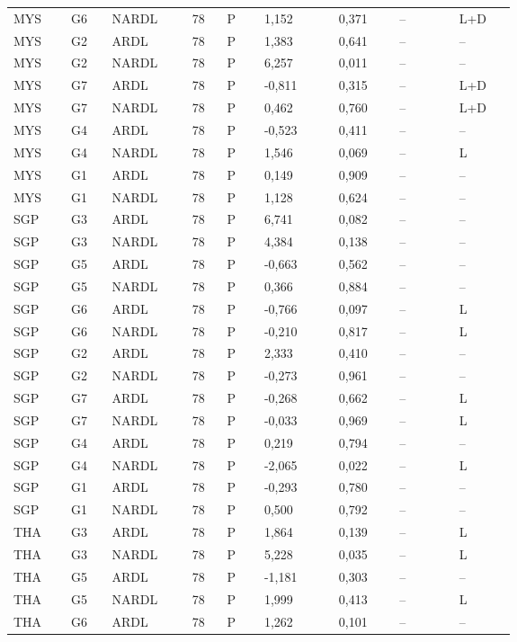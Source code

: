 {\begin{longtable}{p{0.075\linewidth}p{0.05\linewidth}p{0.09\linewidth}p{0.04\linewidth}p{0.05\linewidth}p{0.1\linewidth}p{0.085\linewidth}p{0.085\linewidth}p{0.075\linewidth}}
MYS & G6 & NARDL & 78 & P & 1,152 & 0,371 & -- & L+D\\
MYS & G2 & ARDL & 78 & P & 1,383 & 0,641 & -- & --\\
MYS & G2 & NARDL & 78 & P & 6,257 & 0,011 & -- & --\\
MYS & G7 & ARDL & 78 & P & -0,811 & 0,315 & -- & L+D\\
MYS & G7 & NARDL & 78 & P & 0,462 & 0,760 & -- & L+D\\
MYS & G4 & ARDL & 78 & P & -0,523 & 0,411 & -- & --\\
MYS & G4 & NARDL & 78 & P & 1,546 & 0,069 & -- & L\\
MYS & G1 & ARDL & 78 & P & 0,149 & 0,909 & -- & --\\
MYS & G1 & NARDL & 78 & P & 1,128 & 0,624 & -- & --\\
SGP & G3 & ARDL & 78 & P & 6,741 & 0,082 & -- & --\\
SGP & G3 & NARDL & 78 & P & 4,384 & 0,138 & -- & --\\
SGP & G5 & ARDL & 78 & P & -0,663 & 0,562 & -- & --\\
SGP & G5 & NARDL & 78 & P & 0,366 & 0,884 & -- & --\\
SGP & G6 & ARDL & 78 & P & -0,766 & 0,097 & -- & L\\
SGP & G6 & NARDL & 78 & P & -0,210 & 0,817 & -- & L\\
SGP & G2 & ARDL & 78 & P & 2,333 & 0,410 & -- & --\\
SGP & G2 & NARDL & 78 & P & -0,273 & 0,961 & -- & --\\
SGP & G7 & ARDL & 78 & P & -0,268 & 0,662 & -- & L\\
SGP & G7 & NARDL & 78 & P & -0,033 & 0,969 & -- & L\\
SGP & G4 & ARDL & 78 & P & 0,219 & 0,794 & -- & --\\
SGP & G4 & NARDL & 78 & P & -2,065 & 0,022 & -- & L\\
SGP & G1 & ARDL & 78 & P & -0,293 & 0,780 & -- & --\\
SGP & G1 & NARDL & 78 & P & 0,500 & 0,792 & -- & --\\
THA & G3 & ARDL & 78 & P & 1,864 & 0,139 & -- & L\\
THA & G3 & NARDL & 78 & P & 5,228 & 0,035 & -- & L\\
THA & G5 & ARDL & 78 & P & -1,181 & 0,303 & -- & --\\
THA & G5 & NARDL & 78 & P & 1,999 & 0,413 & -- & L\\
THA & G6 & ARDL & 78 & P & 1,262 & 0,101 & -- & --\\

\end{longtable}}
